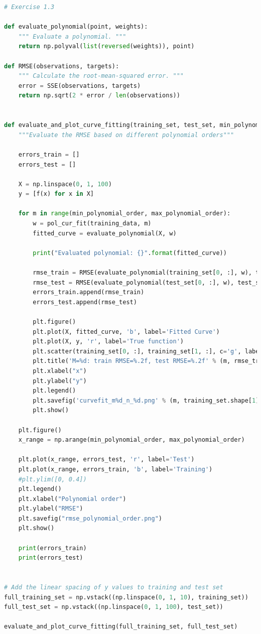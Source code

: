 \documentclass[a4paper]{article}
\begin{document}
\begin{lstlisting}[language=Python]
# Exercise 1.3

def evaluate_polynomial(point, weights):
    """ Evaluate a polynomial. """
    return np.polyval(list(reversed(weights)), point)

def RMSE(observations, targets):
    """ Calculate the root-mean-squared error. """
    error = SSE(observations, targets)
    return np.sqrt(2 * error / len(observations))


def evaluate_and_plot_curve_fitting(training_set, test_set, min_polynomial_order = 0, max_polynomial_order = 10):
    """Evaluate the RMSE based on different polynomial orders"""
    
    errors_train = []
    errors_test = []
    
    X = np.linspace(0, 1, 100)
    y = [f(x) for x in X]
    
    for m in range(min_polynomial_order, max_polynomial_order):
        w = pol_cur_fit(training_data, m)
        fitted_curve = evaluate_polynomial(X, w)
        
        print("Evaluated polynomial: {}".format(fitted_curve))

        rmse_train = RMSE(evaluate_polynomial(training_set[0, :], w), training_set[1, :])
        rmse_test = RMSE(evaluate_polynomial(test_set[0, :], w), test_set[1, :])
        errors_train.append(rmse_train)
        errors_test.append(rmse_test)
        
        plt.figure()
        plt.plot(X, fitted_curve, 'b', label='Fitted Curve')
        plt.plot(X, y, 'r', label='True function')
        plt.scatter(training_set[0, :], training_set[1, :], c='g', label='Noisy observations')
        plt.title('M=%d: train RMSE=%.2f, test RMSE=%.2f' % (m, rmse_train, rmse_test))
        plt.xlabel("x")
        plt.ylabel("y")
        plt.legend()
        plt.savefig('curvefit_m%d_n_%d.png' % (m, training_set.shape[1]))
        plt.show()
        
    plt.figure()    
    x_range = np.arange(min_polynomial_order, max_polynomial_order)
        
    plt.plot(x_range, errors_test, 'r', label='Test')
    plt.plot(x_range, errors_train, 'b', label='Training')
    #plt.ylim([0, 0.4])
    plt.legend()
    plt.xlabel("Polynomial order")
    plt.ylabel("RMSE")
    plt.savefig("rmse_polynomial_order.png")
    plt.show()
    
    print(errors_train)
    print(errors_test)
  
        
# Add the linear spacing of y values to training and test set
full_training_set = np.vstack((np.linspace(0, 1, 10), training_set))
full_test_set = np.vstack((np.linspace(0, 1, 100), test_set))        
        
evaluate_and_plot_curve_fitting(full_training_set, full_test_set)
\end{lstlisting}
\end{document}

